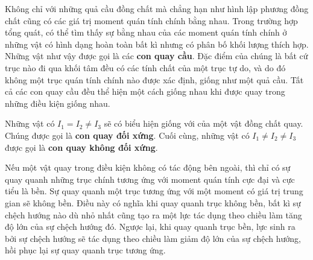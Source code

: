 Không chỉ với những quả cầu đồng chất mà chẳng hạn như hình lập phương đồng chất cũng có các giá trị moment quán tính chính bằng nhau. Trong trường hợp tổng quát, có thể tìm thấy sự bằng nhau của các moment quán tính chính ở những vật có hình dạng hoàn toàn bất kì nhưng có phân bố khối lượng thích hợp. Những vật như vậy được gọi là các \textbf{con quay cầu}. Đặc điểm của chúng là bất cứ trục nào đi qua khối tâm đều có các tính chất của một trục tự do, và do đó không một trục quán tính chính nào được xác định, giống như một quả cầu. Tất cả các con quay cầu đều thể hiện một cách giống nhau khi được quay trong những điều kiện giống nhau.

Những vật có $I_1=I_2\neq I_3$ sẽ có biểu hiện giống với của một vật đồng chất quay. Chúng được gọi là \textbf{con quay đối xứng}. Cuối cùng, những vật có $I_1\neq I_2\neq I_3$ được gọi là \textbf{con quay không đối xứng}.

Nếu một vật quay trong điều kiện không có tác động bên ngoài, thì chỉ có sự quay quanh những trục chính tương ứng với moment quán tính cực đại và cực tiểu là bền. Sự quay quanh một trục tương ứng với một moment có giá trị trung gian sẽ không bền. Điều này có nghĩa khi quay quanh trục không bền, bất kì sự chệch hướng nào dù nhỏ nhất cũng tạo ra một lực tác dụng theo chiều làm tăng độ lớn của sự chệch hướng đó. Ngược lại, khi quay quanh trục bền, lực sinh ra bởi sự chệch hướng sẽ tác dụng theo chiều làm giảm độ lớn của sự chệch hướng, hồi phục lại sự quay quanh trục tương ứng.

